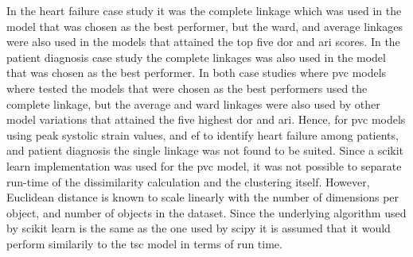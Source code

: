 In the heart failure case study it was the complete linkage which was used in the model that was chosen as the best performer, but the ward, and average linkages were also used in the models that attained the top five \acrshort{dor} and \acrshort{ari} scores. In the patient diagnosis case study the complete linkages was also used in the model that was chosen as the best performer. In both case studies where \acrshort{pvc} models where tested the models that were chosen as the best performers used the complete linkage, but the average and ward linkages were also used by other model variations that attained the five highest \acrshort{dor} and \acrshort{ari}. Hence, for \acrshort{pvc} models using peak systolic strain values, and \acrshort{ef} to identify heart failure among patients, and patient diagnosis the single linkage was not found to be suited. \bigskip
Since a scikit learn implementation was used for the \acrshort{pvc} model, it was not possible to separate run-time of the dissimilarity calculation and the clustering itself. However, Euclidean distance is known to scale linearly with the number of dimensions per object, and number of objects in the dataset. Since the underlying algorithm used by scikit learn is the same as the one used by scipy it is assumed that it would perform similarily to the \acrshort{tsc} model in terms of run time. \bigskip

